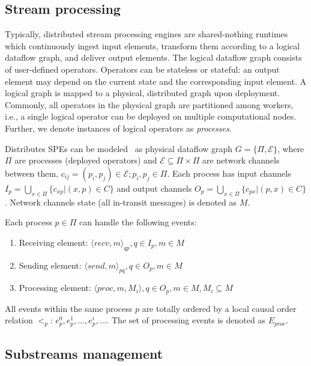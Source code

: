 \label{fs-acker-preliminaries}

\subsection{Stream processing}

Typically, distributed stream processing engines are shared-nothing runtimes which continuously ingest input elements, transform them according to a logical dataflow graph, and deliver output elements. The logical dataflow graph consists of user-defined operators. Operators can be stateless or stateful: an output element may depend on the current state and the corresponding input element. A logical graph is mapped to a physical, distributed graph upon deployment. Commonly, all operators in the physical graph are partitioned among workers, i.e., a single logical operator can be deployed on multiple computational nodes. Further, we denote instances of logical operators as {\em processes}.

Distributes SPEs can be modeled~\cite{carbone2018scalable} as physical dataflow graph $G=\{\Pi,\mathcal{E}\}$, where $\Pi$ are processes (deployed operators) and $\mathcal{E} \subseteq \Pi \times \Pi$ are network channels between them, $c_{ij}=(p_i,p_j)\in \mathcal{E}; p_i,p_j \in \Pi$. Each process has input channels $I_p = \bigcup_{x \in \Pi} \{c_{xp} | (x,p) \in C\}$ and output channels $O_p = \bigcup_{x \in \Pi} \{c_{px} | (p,x) \in C\}$. Network channels state (all in-transit messages) is denoted as $M$. 

Each process $p\in \Pi$ can handle the following events:
\begin{enumerate}
    \item Receiving element: $\langle recv,m\rangle_{qp}, q\in I_p, m\in M$
    \item Sending element: $\langle send,m\rangle_{pq}, q\in O_p, m\in M$
    \item Processing element: $\langle proc,m,M_i\rangle, q\in O_p, m\in M, M_i \subseteq M$
\end{enumerate}

All events within the same process $p$ are totally ordered by a local causal order relation $<_p$: $e^{0}_p,e^{1}_p,...,e^{i}_p,...$. The set of processing events is denoted as $E_{proc}$.

\subsection{Substreams management}

